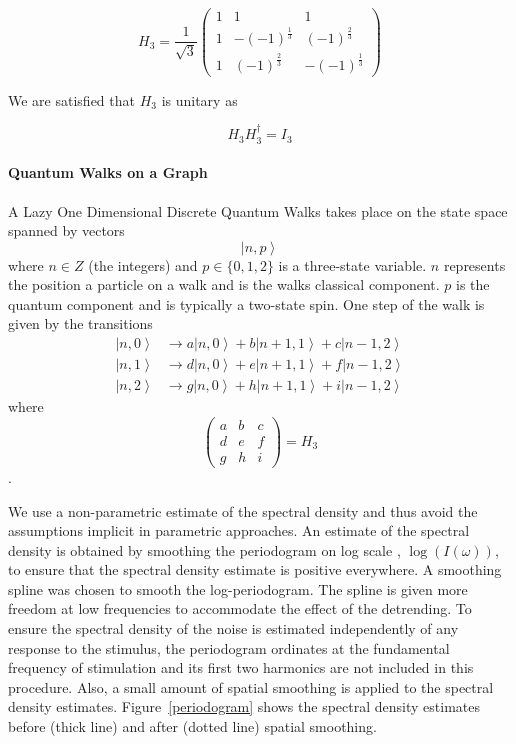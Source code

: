\documentclass[a0,portrait]{a0poster}
\newcommand{\ket}[1]{\left| #1\right\rangle}
\begin{document}
\begin{center}
{\begin{equation}
H_3 = \dfrac{1}{\sqrt{3}} \begin{pmatrix}
  1 & 1 & 1 \\
  1 & -(-1)^{\frac{1}{3}} & (-1)^{\frac{2}{3}} \\
  1 & (-1)^{\frac{2}{3}} & -(-1)^{\frac{1}{3}}
\end{pmatrix}
\label{eq:5}
\end{equation}

We are satisfied that $H_3$ is unitary as 

\begin{equation}
H_{3}H_{3}^{\dagger} = I_3
\label{eq:6}
\end{equation}

\paragraph{Quantum Walks on a Graph}

A Lazy One Dimensional Discrete Quantum Walks takes place 
on the state space spanned by vectors
\begin{equation}
\ket{n,p}
\label{eq:7}
\end{equation}
where $n\in Z$ (the integers)
and $p\in \{0,1,2\}$ is a three-state variable. $n$ represents the position a particle on a walk and is the walks classical component. $p$ is the quantum component and is typically a two-state spin. One step of the walk is given by the transitions
\begin{eqnarray}
\ket{n,0} &\longrightarrow a\ket{n,0} + b\ket{n+1,1} + c\ket{n-1,2}\\
\ket{n,1} &\longrightarrow d\ket{n,0} + e\ket{n+1,1} + f\ket{n-1,2}\\
\ket{n,2} &\longrightarrow g\ket{n,0} + h\ket{n+1,1} + i\ket{n-1,2}
\end{eqnarray} 
where 
\begin{equation}
\begin{pmatrix}
  a & b & c \\
  d & e & f \\
  g & h & i 
\end{pmatrix} = H_3
\end{equation}
\cite{Ke:2003,Mc:2010}.

We use a non-parametric estimate of the spectral density and thus avoid the assumptions implicit in parametric approaches. An estimate of the spectral density is obtained by smoothing the
periodogram on log scale \cite{wahba:1980}, $\log(I(\omega))$, to
ensure that the spectral density estimate is positive everywhere. A smoothing spline \cite{silverman:1985} was chosen to
smooth the log-periodogram. The spline is given more freedom at low frequencies to accommodate the effect of the detrending.
To ensure the spectral density of the noise is estimated independently
of any response to the stimulus, the periodogram ordinates at the
fundamental frequency of stimulation and its first two harmonics are
not included in this procedure. Also, a small amount of spatial smoothing is applied to the spectral density estimates. Figure~\ref{periodogram} shows the spectral density estimates before (thick line) and after (dotted line) spatial smoothing.  


}
\end{center}
\end{document}
